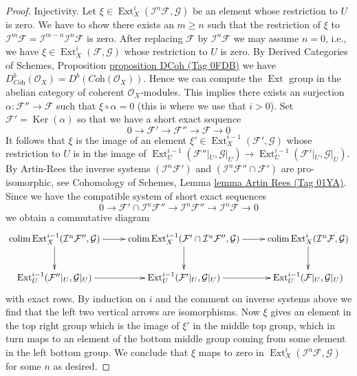 \documentclass{amsart}
\theoremstyle{plain}
\theoremstyle{definition}
\theoremstyle{remark}
\numberwithin{equation}{subsection}
\def\colim{\mathop{\mathrm{colim}}\nolimits}
\def\Ext{\mathop{\mathrm{Ext}}\nolimits}
\def\Ker{\mathop{\mathrm{Ker}}}
\begin{document}
\begin{proof}
\medskip\noindent
Injectivity. Let $\xi \in \Ext^i_X(\mathcal{I}^n\mathcal{F}, \mathcal{G})$
be an element whose restriction to $U$ is zero. We have to show there exists
an $m \geq n$ such that the restriction of $\xi$ to
$\mathcal{I}^m\mathcal{F} = \mathcal{I}^{m - n}\mathcal{I}^n\mathcal{F}$
is zero. After replacing $\mathcal{F}$ by $\mathcal{I}^n\mathcal{F}$
we may assume $n = 0$, i.e., we have
$\xi \in \Ext^i_X(\mathcal{F}, \mathcal{G})$
whose restriction to $U$ is zero. By
Derived Categories of Schemes, Proposition \href{https://stacks.math.columbia.edu/tag/0FDB}{proposition DCoh (Tag 0FDB)}
we have
$D^b_{\textit{Coh}}(\mathcal{O}_X) = D^b(\textit{Coh}(\mathcal{O}_X))$.
Hence we can compute the $\Ext$ group in the abelian category of
coherent $\mathcal{O}_X$-modules. This implies there exists an
surjection $\alpha : \mathcal{F}'' \to \mathcal{F}$ such that
$\xi \circ \alpha = 0$ (this is where we use that $i > 0$).
Set $\mathcal{F}' = \Ker(\alpha)$ so that we have a short exact
sequence
$$
0 \to \mathcal{F}' \to \mathcal{F}'' \to \mathcal{F} \to 0
$$
It follows that $\xi$ is the image of an element
$\xi' \in \Ext^{i - 1}_X(\mathcal{F}', \mathcal{G})$
whose restriction to $U$ is in the image of
$\Ext^{i - 1}_U(\mathcal{F}''|_U, \mathcal{G}|_U) \to
\Ext^{i - 1}_U(\mathcal{F}'|_U, \mathcal{G}|_U)$.
By Artin-Rees the inverse systems $(\mathcal{I}^n\mathcal{F}')$ and
$(\mathcal{I}^n \mathcal{F}'' \cap \mathcal{F}')$ are pro-isomorphic, see
Cohomology of Schemes, Lemma \href{https://stacks.math.columbia.edu/tag/01YA}{lemma Artin Rees (Tag 01YA)}.
Since we have the compatible system of short exact sequences
$$
0 \to
\mathcal{F}' \cap \mathcal{I}^n\mathcal{F}'' \to
\mathcal{I}^n\mathcal{F}'' \to
\mathcal{I}^n\mathcal{F} \to 0
$$
we obtain a commutative diagram
$$
\xymatrix{
\colim \Ext^{i - 1}_X(\mathcal{I}^n\mathcal{F}'', \mathcal{G})
\ar[r] \ar[d] &
\colim \Ext^{i - 1}_X(\mathcal{F}' \cap \mathcal{I}^n\mathcal{F}'', \mathcal{G})
\ar[r] \ar[d] &
\colim \Ext^i_X(\mathcal{I}^n\mathcal{F}, \mathcal{G})
\ar[d] \\
\Ext^{i - 1}_U(\mathcal{F}''|_U, \mathcal{G}|_U) \ar[r] &
\Ext^{i - 1}_U(\mathcal{F}'|_U, \mathcal{G}|_U) \ar[r] &
\Ext^{i - 1}_U(\mathcal{F}|_U, \mathcal{G}|_U)
}
$$
with exact rows. By induction on $i$ and the comment on inverse systems above
we find that the left two vertical arrows are isomorphisms.
Now $\xi$ gives an element in the top right group which is the image
of $\xi'$ in the middle top group, which in turn maps to an element of
the bottom middle group coming from some element in the left bottom group.
We conclude that $\xi$ maps to zero in
$\Ext^i_X(\mathcal{I}^n\mathcal{F}, \mathcal{G})$
for some $n$ as desired.


\end{proof}
\end{document}
